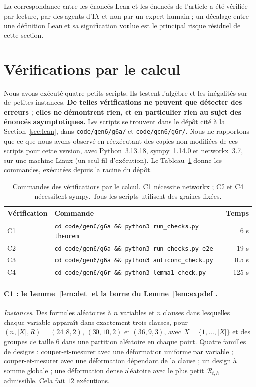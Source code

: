 \documentclass[11pt,a4paper]{article}
\theoremstyle{definition}
\theoremstyle{remark}
\newcommand{\cR}{\mathcal{R}}
\begin{document}
La correspondance entre les énoncés Lean et les énoncés de l'article a été vérifiée par
lecture, par des agents d'IA et non par un expert humain ; un décalage entre une définition
Lean et sa signification voulue est le principal risque résiduel de cette section.

\section{Vérifications par le calcul}\label{sec:checks}

Nous avons exécuté quatre petits scripts. Ils testent l'algèbre et les inégalités sur de
petites instances. \textbf{De telles vérifications ne peuvent que détecter des erreurs ;
elles ne démontrent rien, et en particulier rien au sujet des énoncés asymptotiques.} Les
scripts se trouvent dans le dépôt cité à la Section~\ref{sec:lean}, dans
\texttt{code/gen6/g6a/} et \texttt{code/gen6/g6r/}. Nous ne rapportons que ce que nous avons
observé en réexécutant des copies non modifiées de ces scripts pour cette version, avec
Python~3.13.18, sympy~1.14.0 et networkx~3.7, sur une machine Linux (un seul fil
d'exécution). Le Tableau~\ref{tab:checks} donne les commandes, exécutées depuis la racine du
dépôt.

\begin{table}[htbp]
\centering
\small
\begin{tabular}{@{}llr@{}}
\toprule
Vérification & Commande & Temps\\
\midrule
C1 & \texttt{cd code/gen6/g6a \&\& python3 run\_checks.py theorem} & 6 s\\
C2 & \texttt{cd code/gen6/g6a \&\& python3 run\_checks.py e2e} & 19 s\\
C3 & \texttt{cd code/gen6/g6a \&\& python3 anticonc\_check.py} & 0.5 s\\
C4 & \texttt{cd code/gen6/g6r \&\& python3 lemma1\_check.py} & 125 s\\
\bottomrule
\end{tabular}
\caption{Commandes des vérifications par le calcul. C1 nécessite networkx ; C2 et C4
nécessitent sympy. Tous les scripts utilisent des graines fixées.}\label{tab:checks}
\end{table}

\paragraph{C1 : le Lemme~\ref{lem:det} et la borne du Lemme~\ref{lem:expdef}.}
\emph{Instances.} Des formules aléatoires à $n$ variables et $n$ clauses dans lesquelles
chaque variable apparaît dans exactement trois clauses, pour $(n,|X|,R)=(24,8,2)$,
$(30,10,2)$ et $(36,9,3)$, avec $X=\{1,\dots,|X|\}$ et des groupes de taille $6$ dans une
partition aléatoire en chaque point. Quatre familles de designs : couper-et-mesurer avec une
déformation uniforme par variable ; couper-et-mesurer avec une déformation dépendant de la
clause ; un design \og à somme globale\fg{} ; une déformation dense aléatoire avec le plus
petit $\cR_{t,h}$ admissible. Cela fait $12$ exécutions.
\end{document}
